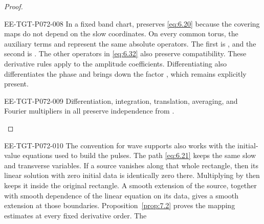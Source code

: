 \begin{proof}
\begin{EESegment}{EE-TGT-P072-008}
In a fixed band chart,  preserves \eqref{eq:6.20} because the covering maps do not depend on the slow coordinates. On every common torus, the auxiliary terms  and  represent the same absolute operators. The first is , and the second is . The other operators in \eqref{eq:6.32} also preserve compatibility. These derivative rules apply to the amplitude coefficients. Differentiating  also differentiates the phase and brings down the factor , which remains explicitly present.
\end{EESegment}

\begin{EESegment}{EE-TGT-P072-009}
Differentiation, integration, translation, averaging, and Fourier multipliers in  all preserve independence from .
\end{EESegment}
\end{proof}

\begin{EESegment}{EE-TGT-P072-010}
The convention for wave supports also works with the initial-value equations used to build the pulses. The path \eqref{eq:6.21} keeps the same slow and transverse variables. If a source vanishes along that whole rectangle, then its linear solution with zero initial data is identically zero there. Multiplying by  then keeps it inside the original rectangle. A smooth extension of the source, together with smooth dependence of the linear equation on its data, gives a smooth extension at those boundaries. Proposition~\ref{prop:7.2} proves the mapping estimates at every fixed derivative order. The
\end{EESegment}
